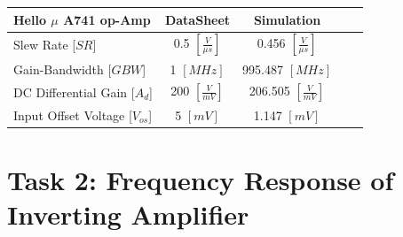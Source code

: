\documentclass[11pt,a4paper]{article}
\begin{document}
\begin{enumerate}
\begin{minipage}{\linewidth}
\begin{center}
  \begin{tabular}{l*{3}{c}r}{Hello}
    $\mu$ A741 op-Amp              & DataSheet & Simulation  \\
    \hline
    Slew Rate [$SR$] & 0.5 $ [\frac{V}{\mu s}]$ & 0.456 $      [\frac{V}{\mu s}]$ \\
  Gain-Bandwidth [$GBW$]& 1 $ [MHz]$  & 995.487 $ [MHz]$ \\
  DC Differential Gain [$A_{d}$] & 200 $[\frac{V}{mV}]$ & 206.505 $[\frac{V}{mV}]$ \\
  Input Offset Voltage [$V_{os}$] & 5 $[mV]$& 1.147 $[mV]$ \\
    \end{tabular}
\end{center}
\end{minipage}
\end{enumerate}

\section*{Task 2: Frequency Response of Inverting Amplifier}
\end{document}
